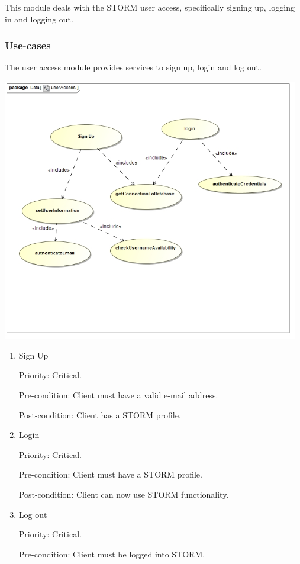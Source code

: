 This module deals with the STORM user access, specifically signing up, logging in and logging out.

\subsubsection{Use-cases}
The user access module provides services to sign up, login and log out.\par
\includegraphics[width=13cm]{./graphics/userAccessUseCase.jpg}
    \rule{0\linewidth}{0.15\linewidth}\par
\begin{enumerate}
\item Sign Up\par
Priority: Critical.\par
Pre-condition: Client must have a valid e-mail address.\par
Post-condition: Client has a STORM profile.\par
\item Login\par
Priority: Critical.\par
Pre-condition: Client must have a STORM profile.\par
Post-condition: Client can now use STORM functionality.\par
\item Log out\par
Priority: Critical.\par
Pre-condition: Client must be logged into STORM.\par
\end{enumerate}

